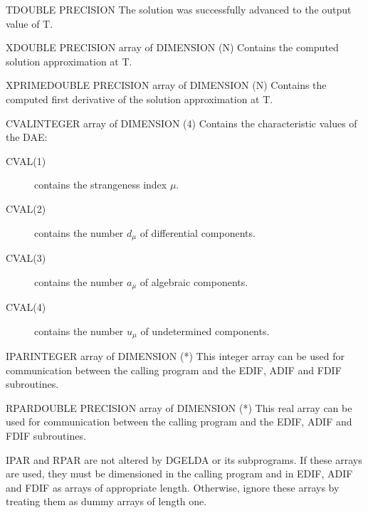 \begin{entry}{T}{DOUBLE PRECISION}
  The solution was successfully advanced to the output value of T.
\end{entry}
\begin{entry}{X}{DOUBLE PRECISION array of DIMENSION (N)}
  Contains the computed solution approximation at T.
\end{entry}
\begin{entry}{XPRIME}{DOUBLE PRECISION array of DIMENSION (N)}
  Contains the computed first derivative of the solution approximation at T.
\end{entry}
\begin{entry}{CVAL}{INTEGER array of DIMENSION (4)}
  Contains the characteristic values of the DAE:
  \begin{description}
  \item[CVAL(1)] contains the strangeness index $\mu$.
  \item[CVAL(2)] contains the number $d_{\mu}$ of differential
    components.
  \item[CVAL(3)] contains the number $a_{\mu}$ of algebraic
    components.
  \item[CVAL(4)] contains the number $u_{\mu}$ of undetermined components.
  \end{description}
\end{entry}

\begin{entry}{IPAR}{INTEGER array of DIMENSION (*)}
  This integer array can be used for communication between the calling
  program and the EDIF, ADIF and FDIF subroutines.
\end{entry}
\begin{entry}{RPAR}{DOUBLE PRECISION array of DIMENSION (*)}
  This real array can be used for communication between the calling
  program and the EDIF, ADIF and FDIF subroutines. 

  IPAR and RPAR are not altered by DGELDA or its subprograms. If these
  arrays are used, they must be dimensioned in the calling program and
  in EDIF, ADIF and FDIF as arrays of appropriate length. Otherwise,
  ignore these arrays by treating them as dummy arrays of length one.
\end{entry}

